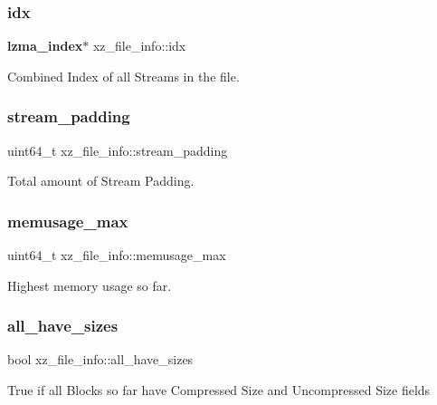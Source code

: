 \subsubsection{idx}
{\footnotesize\ttfamily \textbf{ lzma\+\_\+index}$\ast$ xz\+\_\+file\+\_\+info\+::idx}



Combined Index of all Streams in the file. 

\mbox{\label{structxz__file__info_a5a4120e2aef7ba7d162fcd6b79bc6f8c}} 
\subsubsection{stream\+\_\+padding}
{\footnotesize\ttfamily uint64\+\_\+t xz\+\_\+file\+\_\+info\+::stream\+\_\+padding}



Total amount of Stream Padding. 

\mbox{\label{structxz__file__info_a8f1b065dd64bc47ada4911db1967c417}} 
\subsubsection{memusage\+\_\+max}
{\footnotesize\ttfamily uint64\+\_\+t xz\+\_\+file\+\_\+info\+::memusage\+\_\+max}



Highest memory usage so far. 

\mbox{\label{structxz__file__info_a62fca83737e92ef88fc8d1d26c94f3ec}} 
\subsubsection{all\+\_\+have\+\_\+sizes}
{\footnotesize\ttfamily bool xz\+\_\+file\+\_\+info\+::all\+\_\+have\+\_\+sizes}

True if all Blocks so far have Compressed Size and Uncompressed Size fields \mbox{\label{structxz__file__info_a2a1625c5626e4a1dcc280b952ebb0038}} 
